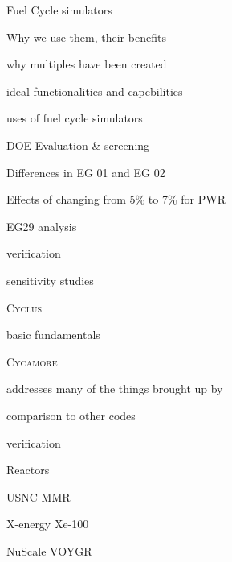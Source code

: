 \documentclass{report}
\newcommand{\Cyclus}{\textsc{Cyclus}\xspace}%
\newcommand{\Cycamore}{\textsc{Cycamore}\xspace}%
\begin{document}
\begin{outline}
\begin{outline}
    \item Fuel Cycle simulators
    \begin{outline}
        \item Why we use them, their benefits
        \item why multiples have been created
        \item ideal functionalities and capcbilities \cite{huff_next_2010,brown_identification_2016}
        \item uses of fuel cycle simulators
        \begin{outline}
            \item \gls{DOE} Evaluation \& screening \cite{wigeland_nuclear_2014}
                \begin{outline}
                      \item Differences in EG 01 and EG 02 
                \end{outline}
            \item Effects of changing from 5\% to 7\% for PWR \cite{burns_reactor_2020}
            \item EG29 analysis \cite{sunny_transition_2015}
            \item verification \cite{feng_standardized_2016}
        \end{outline}
        \item sensitivity studies
        \item \Cyclus \cite{huff_fundamental_2016}
        \begin{outline}
              \item basic fundamentals 
              \item \Cycamore \cite{scopatz_cyclus_2015}
              \item addresses many of the things brought up by \cite{huff_next_2010}
              \item comparison to other codes \cite{djokic_application_2015}
              \item verification \cite{bae_standardized_2019}
        \end{outline}
    \end{outline}
    \item Reactors
    \begin{outline}
        \item USNC MMR \cite{hussain_advances_2018}
        \item X-energy Xe-100 \cite{harlan_x-energy_2018}
        \item NuScale VOYGR
    \end{outline}
    

\end{outline}
\end{outline}
\end{document}
